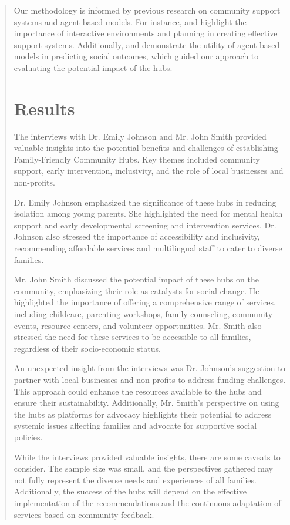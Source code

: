 \documentclass{article} %
\begin{document}
\begin{abstract}
Our methodology is informed by previous research on community support systems and agent-based models. For instance, \citet{park2023generative} and \citet{shanahan2023role} highlight the importance of interactive environments and planning in creating effective support systems. Additionally, \citet{liu2023agentbench} and \citet{poledna2023economic} demonstrate the utility of agent-based models in predicting social outcomes, which guided our approach to evaluating the potential impact of the hubs.


\section{Results}
\label{sec:results}

The interviews with Dr. Emily Johnson and Mr. John Smith provided valuable insights into the potential benefits and challenges of establishing Family-Friendly Community Hubs. Key themes included community support, early intervention, inclusivity, and the role of local businesses and non-profits.

Dr. Emily Johnson emphasized the significance of these hubs in reducing isolation among young parents. She highlighted the need for mental health support and early developmental screening and intervention services. Dr. Johnson also stressed the importance of accessibility and inclusivity, recommending affordable services and multilingual staff to cater to diverse families.

Mr. John Smith discussed the potential impact of these hubs on the community, emphasizing their role as catalysts for social change. He highlighted the importance of offering a comprehensive range of services, including childcare, parenting workshops, family counseling, community events, resource centers, and volunteer opportunities. Mr. Smith also stressed the need for these services to be accessible to all families, regardless of their socio-economic status.

An unexpected insight from the interviews was Dr. Johnson's suggestion to partner with local businesses and non-profits to address funding challenges. This approach could enhance the resources available to the hubs and ensure their sustainability. Additionally, Mr. Smith's perspective on using the hubs as platforms for advocacy highlights their potential to address systemic issues affecting families and advocate for supportive social policies.

While the interviews provided valuable insights, there are some caveats to consider. The sample size was small, and the perspectives gathered may not fully represent the diverse needs and experiences of all families. Additionally, the success of the hubs will depend on the effective implementation of the recommendations and the continuous adaptation of services based on community feedback.


\end{abstract}
\end{document}
